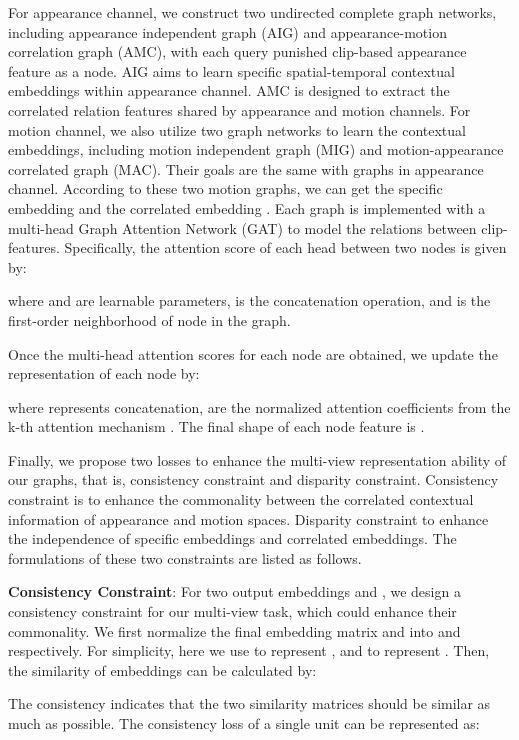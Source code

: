 \documentclass[journal]{IEEEtran}
\begin{document}
For appearance channel, we construct two undirected complete graph networks, including appearance independent graph (AIG) and appearance-motion correlation graph (AMC), with each query punished clip-based appearance feature as a node. AIG aims to learn specific spatial-temporal contextual embeddings  within appearance channel. AMC is designed to extract the correlated relation features  shared by appearance and motion channels. For motion channel, we also utilize two graph networks to learn the contextual embeddings, including motion independent graph (MIG) and motion-appearance correlated graph (MAC). Their goals are the same with graphs in appearance channel. According to these two motion graphs, we can get the specific embedding  and the correlated embedding . Each graph is implemented with a multi-head Graph Attention Network (GAT) to model the relations between clip-features. Specifically, the attention score of each head  between two nodes is given by:



where  and  are learnable parameters,  is the concatenation operation, and  is the first-order neighborhood of node  in the graph.

Once the multi-head attention scores for each node are obtained, we update the representation of each node by:

where  represents concatenation,  are the normalized attention coefficients from the k-th attention mechanism . The final shape of each node feature is . 

Finally, we propose two losses to enhance the multi-view representation ability of our graphs, that is, consistency constraint and disparity constraint. Consistency constraint is to enhance the commonality between the correlated contextual information of appearance and motion spaces. Disparity constraint to enhance the independence of specific embeddings and correlated embeddings. The formulations of these two constraints are listed as follows.

\textbf{Consistency Constraint}:
For two output embeddings  and , we design a consistency constraint for our multi-view task, which could enhance their commonality. We first normalize the final embedding matrix  and  into  and  respectively. For simplicity, here we use  to represent , and  to represent .
Then, the similarity of  embeddings can be calculated by:

The consistency indicates that the two similarity matrices should be similar as much as possible. The consistency loss of a single unit can be represented as:
\end{document}
